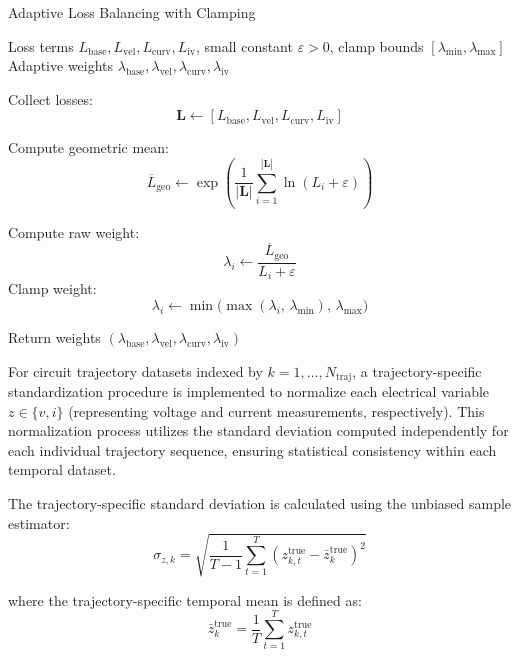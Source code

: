 \documentclass[11pt, oneside]{article}
\begin{document}
\begin{algorithm}[H]
    \caption{Adaptive Loss Balancing with Clamping}
    \label{alg:adaptive_loss_balancing}
    \begin{algorithmic}[1]
        \Require Loss terms $L_{\text{base}}, L_{\text{vel}}, L_{\text{curv}}, L_{\text{iv}}$, small constant $\varepsilon > 0$, clamp bounds $[\lambda_{\min}, \lambda_{\max}]$
        \Ensure Adaptive weights $\lambda_{\text{base}}, \lambda_{\text{vel}}, \lambda_{\text{curv}}, \lambda_{\text{iv}}$
        \Statex

        \State Collect losses:
        \[
            \mathbf{L} \gets [L_{\text{base}}, L_{\text{vel}}, L_{\text{curv}}, L_{\text{iv}}]
        \]

        \State Compute geometric mean:
        \[
            \overline{L}_{\text{geo}} \gets \exp\!\left(\frac{1}{|\mathbf{L}|} \sum_{i=1}^{|\mathbf{L}|} \ln(L_i + \varepsilon)\right)
        \]

        \State Compute raw weight:
        \[
            \lambda_i \gets \frac{\overline{L}_{\text{geo}}}{L_i + \varepsilon}
        \]
        \State Clamp weight:
        \[
            \lambda_i \gets \min\!\big(\max(\lambda_i, \, \lambda_{\min}), \, \lambda_{\max}\big)
        \]
        \EndFor

        \State Return weights $(\lambda_{\text{base}}, \lambda_{\text{vel}}, \lambda_{\text{curv}}, \lambda_{\text{iv}})$
    \end{algorithmic}
\end{algorithm}


For circuit trajectory datasets indexed by $k = 1, \ldots, N_{\text{traj}}$, a trajectory-specific standardization procedure is implemented to normalize each electrical variable $z \in \{v, i\}$ (representing voltage and current measurements, respectively). This normalization process utilizes the standard deviation computed independently for each individual trajectory sequence, ensuring statistical consistency within each temporal dataset.

The trajectory-specific standard deviation is calculated using the unbiased sample estimator:
\begin{equation}
    \sigma_{z,k} = \sqrt{\frac{1}{T-1} \sum_{t=1}^{T} \left(z_{k,t}^{\mathrm{true}} - \bar{z}_k^{\mathrm{true}}\right)^2}
\end{equation}

where the trajectory-specific temporal mean is defined as:
\begin{equation}
    \bar{z}_k^{\mathrm{true}} = \frac{1}{T} \sum_{t=1}^{T} z_{k,t}^{\mathrm{true}}
\end{equation}
\end{document}
